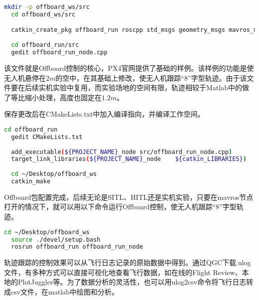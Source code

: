 \begin{lstlisting}[language=Bash, basicstyle=\footnotesize, linewidth=\linewidth, breaklines=true]
  mkdir -p offboard_ws/src
  cd offboard_ws/src

  catkin_create_pkg offboard_run roscpp std_msgs geometry_msgs mavros_msgs
  
  cd offboard_run/src
  gedit offboard_run_node.cpp
\end{lstlisting}

该文件就是Offboard控制的核心，PX4官网提供了基础的样例\cite{Offboard}。该样例的功能是使无人机悬停在$2m$的空中，在其基础上修改，使无人机跟踪“8”字型轨迹。由于该文件要在后续实机实验中复用，而实验场地的空间有限，轨迹相较于Matlab中的做了等比缩小处理，高度也固定在$1.2m$。

保存更改后在CMakeLists.txt中加入编译指向，并编译工作空间。

\begin{lstlisting}[language=Bash, basicstyle=\footnotesize, linewidth=\linewidth, breaklines=true]
  cd offboard_run
  gedit CMakeLists.txt
  
  add_executable(${PROJECT_NAME}_node src/offboard_run_node.cpp)
  target_link_libraries(${PROJECT_NAME}_node    ${catkin_LIBRARIES})
  
  cd ~/Desktop/offboard_ws
  catkin_make
\end{lstlisting}
  
Offboard包配置完成，后续无论是SITL、HITL还是实机实验，只要在mavros节点打开的情况下，就可以用以下命令运行Offboard控制，使无人机跟踪“8”字型轨迹。

\begin{lstlisting}[language=Bash, basicstyle=\footnotesize, linewidth=\linewidth, breaklines=true]
  cd ~/Desktop/offboard_ws
  source ./devel/setup.bash
  rosrun offboard_run offboard_run_node
\end{lstlisting}

轨迹跟踪的控制效果可以从飞行日志记录的原始数据中得到。通过QGC下载.ulog文件，有多种方式可以直接可视化地查看飞行数据，如在线的Flight Review、本地的PlotJuggler等。为了数据分析的灵活性，也可以用ulog2csv命令将飞行日志转成csv文件，在matlab中绘图和分析。